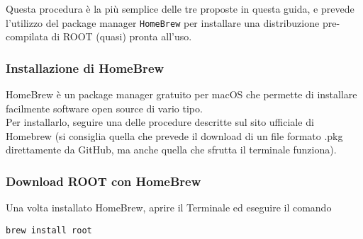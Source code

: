 Questa procedura è la più semplice delle tre proposte in questa guida, e prevede l'utilizzo del package manager \texttt{HomeBrew} per installare una distribuzione pre-compilata di ROOT (quasi) pronta all'uso.\\

\subsubsection{Installazione di HomeBrew}
HomeBrew è un package manager gratuito per macOS che permette di installare facilmente software open source di vario tipo. \\
Per installarlo, seguire una delle procedure descritte sul sito ufficiale di Homebrew \cite{brew_page} (si consiglia quella che prevede il download di un file formato .pkg direttamente da GitHub, ma anche quella che sfrutta il terminale funziona).\\

\subsubsection{Download ROOT con HomeBrew}
Una volta installato HomeBrew, aprire il Terminale ed eseguire il comando
\begin{verbatim}
brew install root
\end{verbatim}
